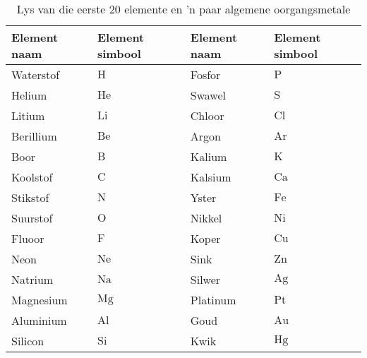 \begin{table}[H]
\label{tab:elements}
\begin{center}
\begin{tabular}{|l|l|l|l|}\hline
\textbf{Element naam} & \textbf{Element simbool} & \textbf{Element naam} & \textbf{Element simbool} \\ \hline
Waterstof & $\text{H}$ & Fosfor & $\text{P}$  \\ \hline
Helium & $\text{He}$ & Swawel & $\text{S}$ \\ \hline
Litium & $\text{Li}$ & Chloor & $\text{Cl}$ \\ \hline
Berillium & $\text{Be}$ & Argon & $\text{Ar}$ \\ \hline 
Boor & $\text{B}$ & Kalium & $\text{K}$ \\ \hline
Koolstof & $\text{C}$ & Kalsium & $\text{Ca}$ \\ \hline 
Stikstof & $\text{N}$ & Yster & $\text{Fe}$ \\ \hline
Suurstof & $\text{O}$ & Nikkel & $\text{Ni}$ \\ \hline 
Fluoor & $\text{F}$ & Koper & $\text{Cu}$ \\ \hline
Neon & $\text{Ne}$  & Sink & $\text{Zn}$ \\ \hline
Natrium & $\text{Na}$  & Silwer & $\text{Ag}$ \\ \hline
Magnesium & $\text{Mg}$  & Platinum & $\text{Pt}$ \\ \hline
Aluminium & $\text{Al}$ & Goud & $\text{Au}$ \\ \hline
Silicon & $\text{Si}$ & Kwik & $\text{Hg}$  \\ \hline
\end{tabular}
\end{center}
\caption{Lys van die eerste 20 elemente en 'n paar algemene oorgangsmetale}
\end{table}
\par 


      \label{m38708*uid26}
